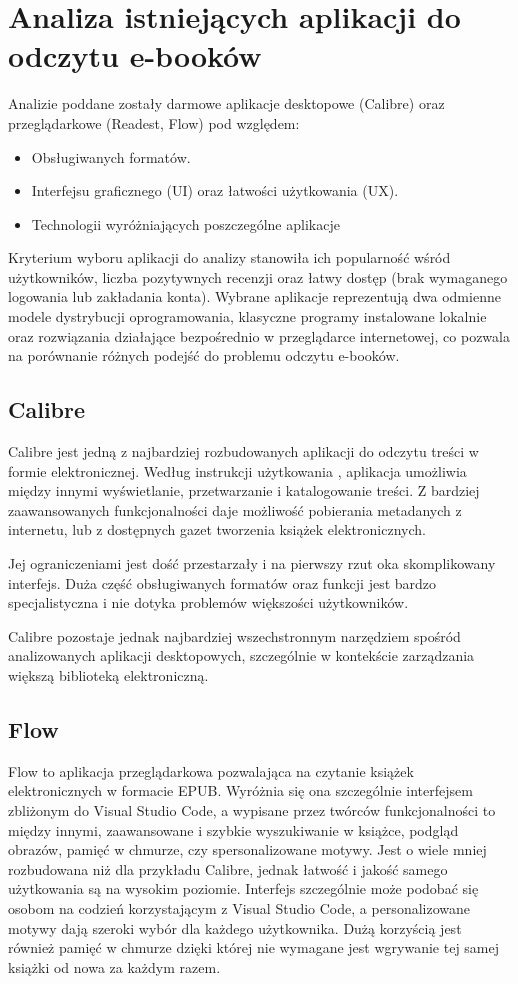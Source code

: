 \chapter{Analiza istniejących aplikacji do odczytu e-booków}

Analizie poddane zostały darmowe aplikacje desktopowe (Calibre) oraz przeglądarkowe (Readest, Flow) pod względem:
\begin{itemize}
    \item Obsługiwanych formatów.
    \item Interfejsu graficznego (UI) oraz łatwości użytkowania (UX).
    \item Technologii wyróżniających poszczególne aplikacje
\end{itemize}

Kryterium wyboru aplikacji do analizy stanowiła ich popularność wśród 
użytkowników, liczba pozytywnych recenzji oraz łatwy dostęp (brak wymaganego logowania lub zakładania konta). Wybrane aplikacje reprezentują dwa odmienne modele dystrybucji oprogramowania, klasyczne programy instalowane lokalnie oraz rozwiązania działające bezpośrednio w przeglądarce internetowej, co pozwala na porównanie różnych podejść do problemu odczytu e-booków.

\section{Calibre}
Calibre jest jedną z najbardziej rozbudowanych aplikacji do odczytu treści w formie elektronicznej. Według instrukcji użytkowania \cite{CalibreUserManual}, aplikacja umożliwia między innymi wyświetlanie, przetwarzanie i katalogowanie treści. Z bardziej zaawansowanych funkcjonalności daje możliwość pobierania metadanych z internetu, lub z dostępnych gazet tworzenia książek elektronicznych.

Jej ograniczeniami jest dość przestarzały i na pierwszy rzut oka skomplikowany interfejs. Duża część obsługiwanych formatów oraz funkcji jest bardzo specjalistyczna i nie dotyka problemów większości użytkowników.

Calibre pozostaje jednak najbardziej wszechstronnym narzędziem spośród analizowanych aplikacji desktopowych, szczególnie w kontekście zarządzania większą biblioteką elektroniczną.

\section{Flow}
Flow to aplikacja przeglądarkowa pozwalająca na czytanie książek elektronicznych w formacie EPUB. Wyróżnia się ona szczególnie interfejsem zbliżonym do Visual Studio Code, a wypisane przez twórców funkcjonalności \cite{Flow} to między innymi, zaawansowane i szybkie wyszukiwanie w książce, podgląd obrazów, pamięć w chmurze, czy spersonalizowane motywy.
\newpage
Jest o wiele mniej rozbudowana niż dla przykładu Calibre, jednak łatwość i jakość samego użytkowania są na wysokim poziomie. Interfejs szczególnie może podobać się osobom na codzień korzystającym z Visual Studio Code, a personalizowane motywy dają szeroki wybór dla każdego użytkownika. Dużą korzyścią jest również pamięć w chmurze dzięki której nie wymagane jest wgrywanie tej samej książki od nowa za każdym razem.

